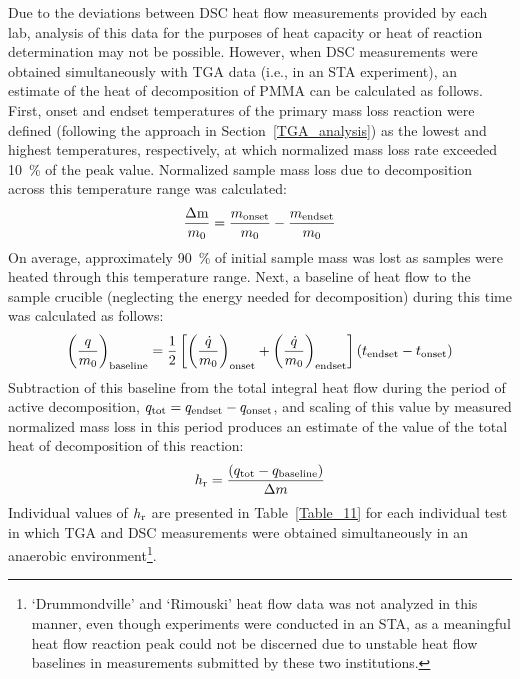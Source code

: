\documentclass{book}
\begin{document}
Due to the deviations between DSC heat flow measurements provided by each lab, analysis of this data for the purposes of heat capacity or heat of reaction determination may not be possible. However, when DSC measurements were obtained simultaneously with TGA data (i.e., in an STA experiment), an estimate of the heat of decomposition of PMMA can be calculated as follows. First, onset and endset temperatures of the primary mass loss reaction were defined (following the approach in Section~\ref{TGA_analysis}) as the lowest and highest temperatures, respectively, at which normalized mass loss rate exceeded 10~\% of the peak value. Normalized sample mass loss due to decomposition across this temperature range was calculated:
\begin{equation}
\frac{\mathrm{\Delta m}}{m_0}=\frac{m_{\rm onset}}{m_0}-\frac{m_{\rm endset}}{m_0}
\end{equation}
On average, approximately 90~\% of initial sample mass was lost as samples were heated through this temperature range. Next, a baseline of heat flow to the sample crucible (neglecting the energy needed for decomposition) during this time was calculated as follows:
\begin{equation}
   \left( \frac{q}{m_0} \right)_{\rm baseline} = \frac{1}{2} \left[ \left( \frac{\dot{q}}{m_0} \right)_{\rm onset} + \left( \frac{\dot{q}}{m_0} \right)_{\rm endset} \right] \left(t_{\rm endset}-t_{\rm onset} \right)
\end{equation}
Subtraction of this baseline from the total integral heat flow during the period of active decomposition, $q_{\rm tot}=q_{\rm endset}-q_{\rm onset}$, and scaling of this value by measured normalized mass loss in this period produces an estimate of the value of the total heat of decomposition of this reaction:
\begin{equation}
h_{\rm r} = \frac{\left(q_{\rm tot}-q_{\rm baseline}\right)}{\Delta m}
\end{equation}
Individual values of $h_{\rm r}$ are presented in Table~\ref{Table_11} for each individual test in which TGA and DSC measurements were obtained simultaneously in an anaerobic environment\footnote{‘Drummondville’ and ‘Rimouski’ heat flow data was not analyzed in this manner, even though experiments were conducted in an STA, as a meaningful heat flow reaction peak could not be discerned due to unstable heat flow baselines in measurements submitted by these two institutions.}.
\end{document}
